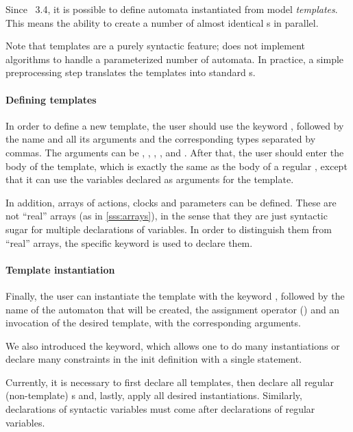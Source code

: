 Since \imitator{}~3.4, it is possible to define automata instantiated from model \emph{templates}.
This means the ability to create a number of almost identical \IPTA{}s in parallel.

Note that templates are a purely syntactic feature; \imitator{} does not implement algorithms to handle a parameterized number of automata.
In practice, a simple preprocessing step translates the templates into standard \IPTA{}s.


\paragraph{Defining templates}
In order to define a new template, the user should use the keyword , followed by the name and all its arguments and the corresponding types separated by commas.
The arguments can be , , , ,  and .
%
After that, the user should enter the body of the template, which is exactly the same as the body of a regular \IPTA{}, except that it can use the variables declared as arguments for the template.

In addition, arrays of actions, clocks and parameters can be defined.
These are not ``real'' arrays (as in \cref{sss:arrays}), in the sense that they are just syntactic sugar for multiple declarations of
variables.
In order to distinguish them from ``real'' arrays, the specific keyword  is used to declare them.

\paragraph{Template instantiation}
Finally, the user can instantiate the template with the keyword , followed by the name of the automaton that will be created, the assignment operator (\styleIMI{<-}) and an invocation of the desired template, with the corresponding arguments.

We also introduced the  keyword, which allows one to do many instantiations or declare many constraints in the init definition with a single statement.

Currently, it is necessary to first declare all templates, then declare all regular (non-template) \IPTA{}s and, lastly, apply all desired instantiations.
Similarly, declarations of syntactic variables must come after declarations of regular variables.


